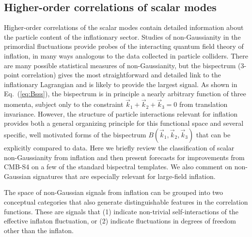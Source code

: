 \subsection{Higher-order correlations of scalar modes}
\label{subsec:scalarNG}
Higher-order correlations of the scalar modes contain detailed information about the particle content of the inflationary sector. Studies of non-Gaussianity in the primordial fluctuations provide probes of the interacting quantum field theory of inflation, in many ways analogous to the data collected in particle colliders. There are many possible statistical measures of non-Gaussianity, but the bispectrum (3-point correlation) gives the most straightforward and detailed link to the inflationary Lagrangian and is likely to provide the largest signal. As shown in Eq.~(\ref{eq:Bsss}), the bispectrum is in principle a nearly arbitrary function of three momenta, subject only to the constraint $\vec{k}_1+\vec{k}_2+\vec{k}_3=0$ from translation invariance. However, the structure of particle interactions relevant for inflation provides both a general organizing principle for this functional space and several specific, well motivated forms of the bispectrum $B(\vec{k}_1,\vec{k}_2,\vec{k}_3)$ that can be explicitly compared to data. Here we briefly review the classification of scalar non-Gaussianity from inflation and then present forecasts for improvements from CMB-S4 on a few of the standard bispectral templates. We also comment on non-Gaussian signatures that are especially relevant for large-field inflation.

The space of non-Gaussian signals from inflation can be grouped into two conceptual categories that also generate distinguishable features in the correlation functions. These are signals that (1) indicate non-trivial self-interactions of the effective inflaton fluctuation, or (2) indicate fluctuations in degrees of freedom other than the inflaton. 

